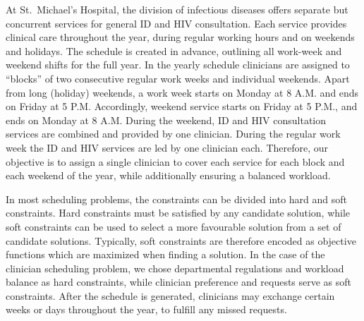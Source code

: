 At St.\ Michael's Hospital, the division of infectious diseases offers
separate but concurrent services for general ID and HIV consultation. Each
service provides clinical care throughout the year, during regular working hours
and on weekends and holidays. The schedule is created in advance,
outlining all work-week and weekend shifts for the full year.
In the yearly schedule clinicians are assigned to ``blocks'' of
two consecutive regular work weeks and individual weekends. Apart
from long (holiday) weekends, a work week starts on Monday at 8 A.M. and ends on
Friday at 5 P.M. Accordingly, weekend service starts on Friday at 5 P.M., and
ends on Monday at 8 A.M. During the weekend, ID and HIV consultation services
are combined and provided by one clinician. During the regular work week the ID
and HIV services are led by one clinician each.
Therefore, our objective is to assign a single clinician to cover
each service for each block and each weekend of the year, while 
additionally ensuring a balanced workload.

In most scheduling problems, the constraints can be divided into hard and soft
constraints. Hard constraints must be satisfied by any candidate solution, while
soft constraints can be used to select a more favourable solution from a set of
candidate solutions. Typically, soft constraints are therefore encoded as objective
functions which are
maximized when finding a solution. In the case of the clinician
scheduling problem, we chose departmental regulations and workload balance as hard constraints,
while clinician preference and requests serve as soft constraints.
After the schedule is generated, clinicians may
exchange certain weeks or days throughout the year, to fulfill any missed requests.

